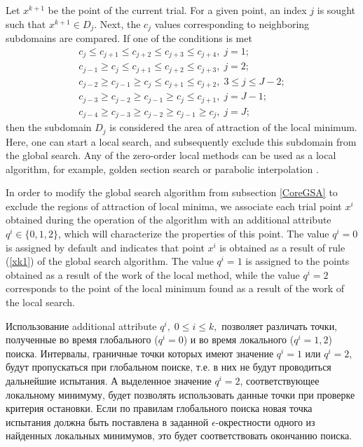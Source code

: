 \documentclass[entropy,article,submit,moreauthors,pdftex]{Definitions/mdpi}
\begin{document}
Let $x^{k+1}$ be the point of the current trial. For a given point, an index  $j$ is sought such that $x^{k+1} \in D_j$. 
Next, the  $c_j$ values corresponding to neighboring subdomains are compared. If one of the conditions is met
\begin{gather}
c_{j} \leq c_{j+1} \leq c_{j+2} \leq c_{j+3} \leq c_{j+4}, \; j=1; \nonumber \\ 
c_{j-1} \geq c_{j} \leq c_{j+1} \leq c_{j+2} \leq c_{j+3}, \; j=2;  \nonumber \\  
c_{j-2} \geq c_{j-1} \geq c_{j} \leq c_{j+1} \leq c_{j+2}, \; 3 \leq j \leq J-2; \label{LPC} \\ 
c_{j-3} \geq c_{j-2} \geq c_{j-1} \geq c_{j} \leq c_{j+1}, \; j=J-1; \nonumber \\ 
c_{j-4} \geq c_{j-3} \geq c_{j-2} \geq c_{j-1} \geq c_{j}, \; j=J; \nonumber 
\end{gather}
then the subdomain $D_j$ is considered the area of attraction of the local minimum. Here, one can start a local search, and subsequently exclude this subdomain from the global search. 
Any of the zero-order local methods can be used as a local algorithm, for example, golden section search or parabolic interpolation \cite{Press}.

In order to modify the global search algorithm from subsection  \ref{CoreGSA} to exclude the regions of attraction of local minima, we associate each trial point  $x^i$ obtained during the operation of the algorithm with an additional attribute $q^i \in \{0,1,2\}$, which will characterize the properties of this point. 
The value  $q^i=0$ is assigned by default and indicates that point $x^i$ is obtained as a result of rule (\ref{xk1}) of the global search algorithm.
The value $q^i=1$ is assigned to the points obtained as a result of the work of the local method, while the value  $q^i=2$ corresponds to the point of the local minimum found as a result of the work of the local search.

Использование additional attribute $q^i, \; 0 \leq i \leq k ,$ позволяет различать точки, полученные во время глобального ($q^i=0$) и во время локального ($q^i=1,2$) поиска. Интервалы, граничные точки которых имеют значение $q^i=1$ или $q^i=2$, будут пропускаться при глобальном поиске, т.е. в них не будут проводиться дальнейшие испытания. 
А выделенное значение $q^i=2$, соответствующее локальному минимуму, будет позволять использовать данные точки при проверке критерия остановки. Если по правилам глобального поиска новая точка испытания должна быть поставлена в заданной $\epsilon$-окрестности одного из найденных локальных минимумов, это будет соответствовать окончанию поиска. 
\end{document}
